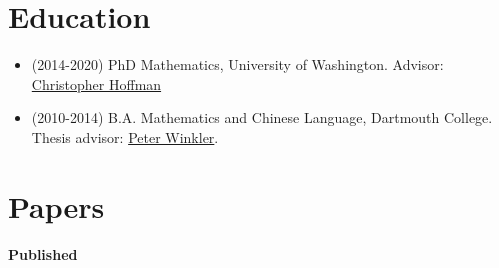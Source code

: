 \documentclass[letterpaper]{article}
\begin{document}
\section*{Education}

\begin{itemize}

  \item (2014-2020) PhD Mathematics, University of Washington. \newline Advisor: \href{https://www.math.washington.edu/~hoffman/}{Christopher Hoffman}
  \item (2010-2014) B.A. Mathematics and Chinese Language, Dartmouth College. \newline Thesis advisor: \href{https://math.dartmouth.edu/~pw/}{Peter Winkler}. 
\end{itemize}

\section*{Papers}

\begin{center} {\textbf{Published}} \end{center}
\end{document}
